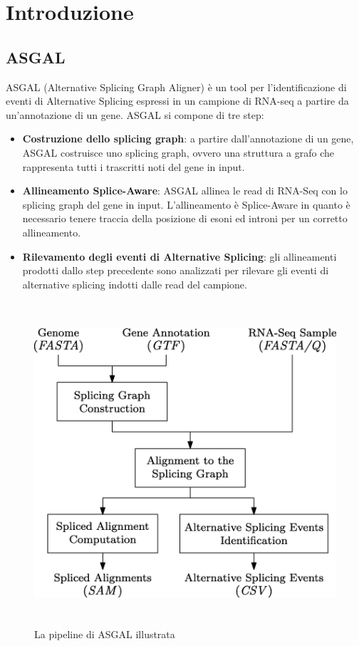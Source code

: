 \section{Introduzione}
\subsection{ASGAL}
ASGAL (Alternative Splicing Graph Aligner) \cite{ASGAL} è un tool per l'identificazione di eventi di Alternative Splicing espressi in un campione di RNA-seq a partire da un'annotazione di un gene. ASGAL si compone di tre step:

\begin{itemize}
	\item \textbf{Costruzione dello splicing graph}: a partire dall'annotazione di un gene, ASGAL costruisce uno splicing graph, ovvero una struttura a grafo che rappresenta tutti i trascritti noti del gene in input.
	\item \textbf{Allineamento Splice-Aware}: ASGAL allinea le read di RNA-Seq con lo splicing graph del gene in input. L'allineamento è Splice-Aware in quanto è necessario tenere traccia della posizione di esoni ed introni per un corretto allineamento.
	\item \textbf{Rilevamento degli eventi di Alternative Splicing}: gli allineamenti prodotti dallo step precedente sono analizzati per rilevare gli eventi di alternative splicing indotti dalle read del campione.
\end{itemize}


\begin{figure}[h!]
	\includegraphics[height=12cm,width=\textwidth]{images/asgal.png}
  \caption{La pipeline di ASGAL illustrata}
  \label{fig:ASGAL}
\end{figure}
